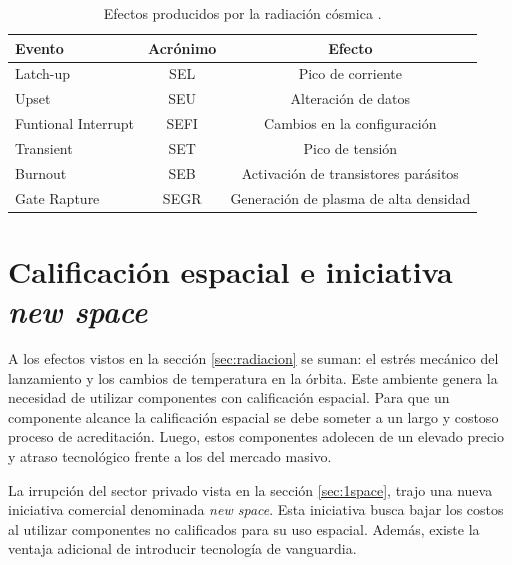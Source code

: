 
\vfill

\begin{table}[h]
	\centering
	\caption[Efectos de la radiación cósmica]{Efectos producidos por la radiación cósmica \citep{WEBSITE:structure_space_radiation}.}
	\begin{tabular}{l c c}    
		\toprule
		\textbf{Evento}      & \textbf{Acrónimo} & \textbf{Efecto}\\
		\midrule
		Latch-up             & SEL               & Pico de corriente\\		
		Upset                & SEU               & Alteración de datos\\
		Funtional Interrupt  & SEFI              & Cambios en la configuración\\
		Transient            & SET               & Pico de tensión\\
		Burnout              & SEB               & Activación de transistores parásitos\\
		Gate Rapture         & SEGR              & Generación de plasma de alta densidad\\
		\bottomrule
		\hline
	\end{tabular}
	\label{tab:radiacion}
\end{table}

\newpage

\section{Calificación espacial e iniciativa \emph{new space}}
\label{sec:newspace}

A los efectos vistos en la sección \ref{sec:radiacion} se suman: el estrés mecánico del lanzamiento y los cambios de temperatura en la órbita.
Este ambiente genera la necesidad de utilizar componentes con calificación espacial.
Para que un componente alcance la calificación espacial se debe someter a un largo y costoso proceso de acreditación.
Luego, estos componentes adolecen de un elevado precio y atraso tecnológico frente a los del mercado masivo.

La irrupción del sector privado vista en la sección \ref{sec:1space}, trajo una nueva iniciativa comercial denominada \emph{new space}.
Esta iniciativa busca bajar los costos al utilizar componentes no calificados para su uso espacial.
Además, existe la ventaja adicional de introducir tecnología de vanguardia.


